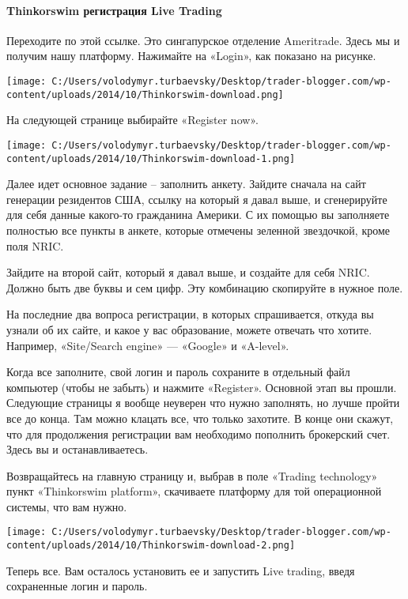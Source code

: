 \documentclass[a5paper]{article}
\begin{document}
\paragraph{Thinkorswim регистрация Live Trading}

Переходите по этой ссылке. Это сингапурское отделение
Ameritrade. Здесь мы и получим нашу платформу. Нажимайте на «Login»,
как показано на рисунке.

\texttt{[image: C:/Users/volodymyr.turbaevsky/Desktop/trader-blogger.com/wp-content/uploads/2014/10/Thinkorswim-download.png]}

На следующей странице выбирайте «Register now».

\texttt{[image: C:/Users/volodymyr.turbaevsky/Desktop/trader-blogger.com/wp-content/uploads/2014/10/Thinkorswim-download-1.png]}

Далее идет основное задание – заполнить анкету. Зайдите сначала на сайт генерации резидентов США, ссылку на который я давал выше, и сгенерируйте для себя данные какого-то гражданина Америки. С их помощью вы заполняете полностью все пункты в анкете, которые отмечены зеленной звездочкой, кроме поля NRIC.

Зайдите на второй сайт, который я давал выше, и создайте для себя NRIC. Должно быть две буквы и сем цифр. Эту комбинацию скопируйте в нужное поле.

На последние два вопроса регистрации, в которых спрашивается, откуда вы узнали об их сайте, и какое у вас образование, можете отвечать что хотите. Например, «Site/Search engine» — «Google» и «A-level».

Когда все заполните, свой логин и пароль сохраните в отдельный файл компьютер (чтобы не забыть) и нажмите «Register». Основной этап вы прошли. Следующие страницы я вообще неуверен что нужно заполнять, но лучше пройти все до конца. Там можно клацать все, что только захотите. В конце они скажут, что для продолжения регистрации вам необходимо пополнить брокерский счет. Здесь вы и останавливаетесь.

Возвращайтесь на главную страницу и, выбрав в поле «Trading
technology» пункт «Thinkorswim platform»,  скачиваете платформу для
той операционной системы, что вам нужно.

\texttt{[image: C:/Users/volodymyr.turbaevsky/Desktop/trader-blogger.com/wp-content/uploads/2014/10/Thinkorswim-download-2.png]}

Теперь все. Вам осталось установить ее и запустить Live trading, введя сохраненные логин и пароль.
\end{document}
